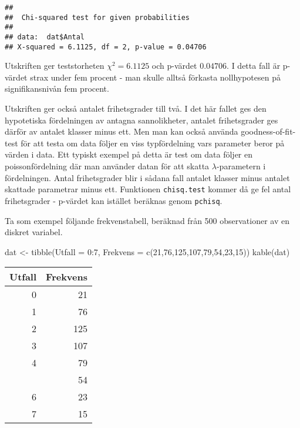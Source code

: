 \documentclass[
]{book}
\newenvironment{Shaded}{\begin{snugshade}}{\end{snugshade}}
\newcommand{\AttributeTok}[1]{\textcolor[rgb]{0.77,0.63,0.00}{#1}}
\newcommand{\DecValTok}[1]{\textcolor[rgb]{0.00,0.00,0.81}{#1}}
\newcommand{\FunctionTok}[1]{\textcolor[rgb]{0.00,0.00,0.00}{#1}}
\newcommand{\NormalTok}[1]{#1}
\newcommand{\OtherTok}[1]{\textcolor[rgb]{0.56,0.35,0.01}{#1}}
\newcommand{\SpecialCharTok}[1]{\textcolor[rgb]{0.00,0.00,0.00}{#1}}
\theoremstyle{definition}
\theoremstyle{definition}
\theoremstyle{definition}
\theoremstyle{definition}
\theoremstyle{remark}
\begin{document}
\begin{verbatim}
## 
##  Chi-squared test for given probabilities
## 
## data:  dat$Antal
## X-squared = 6.1125, df = 2, p-value = 0.04706
\end{verbatim}

Utskriften ger teststorheten \(\chi^2 = 6.1125\) och p-värdet \(0.04706\). I detta fall är p-värdet strax under fem procent - man skulle alltså förkasta nollhypotesen på signifikansnivån fem procent.

Utskriften ger också antalet frihetsgrader till två. I det här fallet ges den hypotetiska fördelningen av antagna sannolikheter, antalet frihetsgrader ges därför av antalet klasser minus ett. Men man kan också använda goodness-of-fit-test för att testa om data följer en viss typfördelning vars parameter beror på värden i data. Ett typiskt exempel på detta är test om data följer en poissonfördelning där man använder datan för att skatta \(\lambda\)-parametern i fördelningen. Antal frihetsgrader blir i sådana fall antalet klasser minus antalet skattade parametrar minus ett. Funktionen \texttt{chisq.test} kommer då ge fel antal frihetsgrader - p-värdet kan istället beräknas genom \texttt{pchisq}.

Ta som exempel följande frekvenstabell, beräknad från 500 observationer av en diskret variabel.

\begin{Shaded}
\begin{Highlighting}[]
\NormalTok{dat }\OtherTok{\textless{}{-}} \FunctionTok{tibble}\NormalTok{(}\AttributeTok{Utfall =} \DecValTok{0}\SpecialCharTok{:}\DecValTok{7}\NormalTok{, }
              \AttributeTok{Frekvens =} \FunctionTok{c}\NormalTok{(}\DecValTok{21}\NormalTok{,}\DecValTok{76}\NormalTok{,}\DecValTok{125}\NormalTok{,}\DecValTok{107}\NormalTok{,}\DecValTok{79}\NormalTok{,}\DecValTok{54}\NormalTok{,}\DecValTok{23}\NormalTok{,}\DecValTok{15}\NormalTok{))}
\FunctionTok{kable}\NormalTok{(dat)}
\end{Highlighting}
\end{Shaded}

\begin{table}
\centering
\begin{tabular}[t]{rr}
\toprule
Utfall & Frekvens\\
\midrule
0 & 21\\
1 & 76\\
2 & 125\\
3 & 107\\
4 & 79\\
\addlinespace
5 & 54\\
6 & 23\\
7 & 15\\
\bottomrule
\end{tabular}
\end{table}
\end{document}
